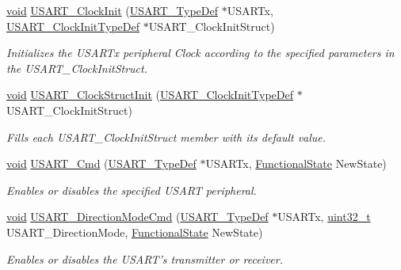 \begin{DoxyCompactItemize}
\hyperlink{group___n_a_m_e_ga18028b8badbf1ea7e704ccac3c488e82}{void} \hyperlink{group___u_s_a_r_t___group1_gadb50c7a2175c91acd3728f8eefd0c63d}{U\-S\-A\-R\-T\-\_\-\-Clock\-Init} (\hyperlink{struct_u_s_a_r_t___type_def}{U\-S\-A\-R\-T\-\_\-\-Type\-Def} $\ast$U\-S\-A\-R\-Tx, \hyperlink{struct_u_s_a_r_t___clock_init_type_def}{U\-S\-A\-R\-T\-\_\-\-Clock\-Init\-Type\-Def} $\ast$U\-S\-A\-R\-T\-\_\-\-Clock\-Init\-Struct)
\begin{DoxyCompactList}\small\item\em Initializes the U\-S\-A\-R\-Tx peripheral Clock according to the specified parameters in the U\-S\-A\-R\-T\-\_\-\-Clock\-Init\-Struct. \end{DoxyCompactList}\item 
\hyperlink{group___n_a_m_e_ga18028b8badbf1ea7e704ccac3c488e82}{void} \hyperlink{group___u_s_a_r_t___group1_ga59df27d0adda18b16ee28d47672cc724}{U\-S\-A\-R\-T\-\_\-\-Clock\-Struct\-Init} (\hyperlink{struct_u_s_a_r_t___clock_init_type_def}{U\-S\-A\-R\-T\-\_\-\-Clock\-Init\-Type\-Def} $\ast$U\-S\-A\-R\-T\-\_\-\-Clock\-Init\-Struct)
\begin{DoxyCompactList}\small\item\em Fills each U\-S\-A\-R\-T\-\_\-\-Clock\-Init\-Struct member with its default value. \end{DoxyCompactList}\item 
\hyperlink{group___n_a_m_e_ga18028b8badbf1ea7e704ccac3c488e82}{void} \hyperlink{group___u_s_a_r_t___group1_ga45e51626739c5f22a6567c8a85d1d85e}{U\-S\-A\-R\-T\-\_\-\-Cmd} (\hyperlink{struct_u_s_a_r_t___type_def}{U\-S\-A\-R\-T\-\_\-\-Type\-Def} $\ast$U\-S\-A\-R\-Tx, \hyperlink{group___exported__types_gac9a7e9a35d2513ec15c3b537aaa4fba1}{Functional\-State} New\-State)
\begin{DoxyCompactList}\small\item\em Enables or disables the specified U\-S\-A\-R\-T peripheral. \end{DoxyCompactList}\item 
\hyperlink{group___n_a_m_e_ga18028b8badbf1ea7e704ccac3c488e82}{void} \hyperlink{group___u_s_a_r_t___group1_ga9841cb352f7bd807f9026c33b682b277}{U\-S\-A\-R\-T\-\_\-\-Direction\-Mode\-Cmd} (\hyperlink{struct_u_s_a_r_t___type_def}{U\-S\-A\-R\-T\-\_\-\-Type\-Def} $\ast$U\-S\-A\-R\-Tx, \hyperlink{stdint_8h_a435d1572bf3f880d55459d9805097f62}{uint32\-\_\-t} U\-S\-A\-R\-T\-\_\-\-Direction\-Mode, \hyperlink{group___exported__types_gac9a7e9a35d2513ec15c3b537aaa4fba1}{Functional\-State} New\-State)
\begin{DoxyCompactList}\small\item\em Enables or disables the U\-S\-A\-R\-T's transmitter or receiver. \end{DoxyCompactList}\item 

\end{DoxyCompactItemize}
